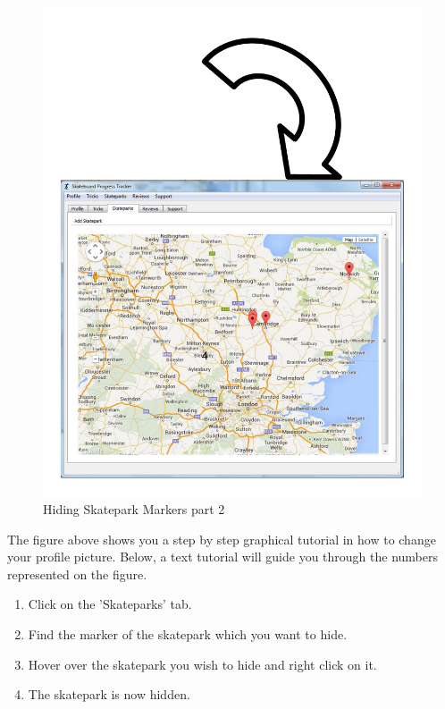 \begin{figure}[H]
    \includegraphics[width=\textwidth]{./Manual/Images/HideSkatepark2.pdf}
    \caption{Hiding Skatepark Markers part 2} \label{fig:Hide Skatepark2}
\end{figure}

The figure above shows you a step by step graphical tutorial in how to change your profile picture. Below, a text tutorial will guide you through the numbers represented on the figure.

\begin{enumerate}
\item Click on the 'Skateparks' tab.
\item Find the marker of the skatepark which you want to hide.
\item Hover over the skatepark you wish to hide and right click on it.
\item The skatepark is now hidden.
\end{enumerate}



